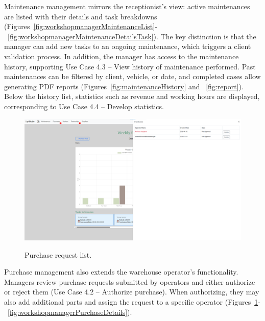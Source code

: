 Maintenance management mirrors the receptionist's view: active maintenances are listed with their details and task breakdowns (Figures~\ref{fig:workshopmanagerMaintenanceList}-~\ref{fig:workshopmanagerMaintenanceDetailsTask}). The key distinction is that the manager can add new tasks to an ongoing maintenance, which triggers a client validation process. In addition, the manager has access to the maintenance history, supporting Use Case 4.3 – View history of maintenance performed. Past maintenances can be filtered by client, vehicle, or date, and completed cases allow generating PDF reports (Figures~\ref{fig:maintenanceHistory} and ~\ref{fig:report}). Below the history list, statistics such as revenue and working hours are displayed, corresponding to Use Case 4.4 – Develop statistics.

\begin{figure}[h]
  \caption{Purchase request list.}
  \centering
  \includegraphics[width=\textwidth]{figs/Implementation/workshopmanager/purchaseList}
  \label{fig:workshopmanagerPurchaseList}
\end{figure}



Purchase management also extends the warehouse operator's functionality. Managers review purchase requests submitted by operators and either authorize or reject them (Use Case 4.2 – Authorize purchase). When authorizing, they may also add additional parts and assign the request to a specific operator (Figures~\ref{fig:workshopmanagerPurchaseList}-~\ref{fig:workshopmanagerPurchaseDetails}).


